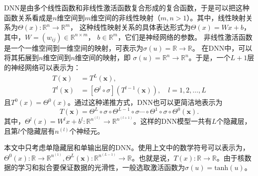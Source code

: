 DNN是由多个线性函数和非线性激活函数复合形成的复合函数，于是可以把这种函数关系看成是$n$维空间到$m$维空间的非线性映射（$m,n>1$）。其中，线性映射关系为$\Theta(x):\mathbb{R}^n\rightarrow \mathbb{R}^{m}$，
这种线性映射关系的具体表达形式为$\Theta(x) = Wx + b$，
其中，$W = (w_{ij})\in \mathbb{R}^{n\times m}$，
$b\in \mathbb{R}^m$，它们是神经网络的参数。
非线性激活函数是一个一维空间到一维空间的映射，可表示为$\sigma (u) = \mathbb{R}\rightarrow \mathbb{R}$。
在DNN中，可以将其拓展到$n$维空间到$n$维空间的映射，即
$\sigma (u) = \mathbb{R}^{n}\rightarrow \mathbb{R}^{n}$。于是，一个$L+1$层的神经网络可以表示为：
\begin{equation}
    \begin{aligned}
T(\boldsymbol{x}) & =T^{L}(\boldsymbol{x}), \\
T^{l}(\boldsymbol{x}) & =\left[\Theta^{l} \circ \sigma\right]\left(T^{l-1}(\boldsymbol{x})\right), \quad l=1,2, \ldots ,L
\end{aligned}
\end{equation}
且$T^{0}(x) = \Theta^{0}(x)$。通过这种递推方式，DNN也可以更简洁地表示为
\begin{equation}
    T(\boldsymbol{x})=\Theta^{L} \circ \sigma \circ \Theta^{L-1} \circ \sigma \cdots \circ \Theta^{1} \circ \sigma \circ \Theta^{0}(\boldsymbol{x}).
\end{equation}
其中，$\Theta ^{l}(x)=W^{l}x+b^{l}:\mathbb{R}^{n^{(l)}}\rightarrow \mathbb{R}^{n^{(l+1)}}$。这样的DNN模型一共有$L$个隐藏层，且第$l$个隐藏层有$n^{(l)}$个神经元。

本文中只考虑单隐藏层和单输出层的DNN。使用上文中的数学符号可以表示为，$\Theta^{0}(x): \mathbb{R} \rightarrow \mathbb{R}^{n^{(1)}}, \Theta^{L}(\boldsymbol{x}):\mathbb{R}^{n^{(L-1)}}\rightarrow \mathbb{R}$。也就是说，$T(x):\mathbb{R}\rightarrow \mathbb{R}$。由于核数据的学习和拟合要保证数据的光滑性，一般选取激活函数为$\sigma (u)=\text{tanh}(u)$。

